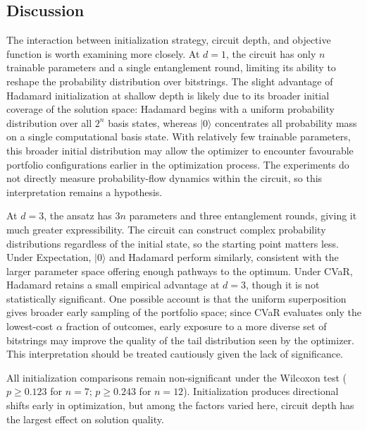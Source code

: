 \documentclass[runningheads]{llncs}
\begin{document}
\subsection{Discussion}

The interaction between initialization strategy, circuit depth, and objective function is worth examining more closely. At $d = 1$, the circuit has only $n$ trainable parameters and a single entanglement round, limiting its ability to reshape the probability distribution over bitstrings. The slight advantage of Hadamard initialization at shallow depth is likely due to its broader initial coverage of the solution space: Hadamard begins with a uniform probability distribution over all $2^n$ basis states, whereas $|0\rangle$ concentrates all probability mass on a single computational basis state. With relatively few trainable parameters, this broader initial distribution may allow the optimizer to encounter favourable portfolio configurations earlier in the optimization process. The experiments do not directly measure probability-flow dynamics within the circuit, so this interpretation remains a hypothesis.

At $d = 3$, the ansatz has $3n$ parameters and three entanglement rounds, giving it much greater expressibility. The circuit can construct complex probability distributions regardless of the initial state, so the starting point matters less. Under Expectation, $|0\rangle$ and Hadamard perform similarly, consistent with the larger parameter space offering enough pathways to the optimum. Under CVaR, Hadamard retains a small empirical advantage at $d = 3$, though it is not statistically significant. One possible account is that the uniform superposition gives broader early sampling of the portfolio space; since CVaR evaluates only the lowest-cost $\alpha$ fraction of outcomes, early exposure to a more diverse set of bitstrings may improve the quality of the tail distribution seen by the optimizer. This interpretation should be treated cautiously given the lack of significance.

All initialization comparisons remain non-significant under the Wilcoxon test ($p \geq 0.123$ for $n = 7$; $p \geq 0.243$ for $n = 12$). Initialization produces directional shifts early in optimization, but among the factors varied here, circuit depth has the largest effect on solution quality.
\end{document}

